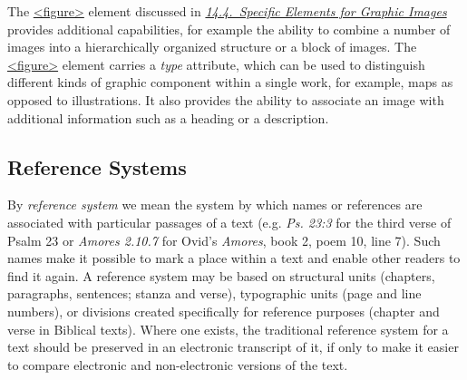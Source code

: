 The \hyperref[TEI.figure]{<figure>} element discussed in \textit{\hyperref[FTGRA]{14.4.\ Specific Elements for Graphic Images}} provides additional capabilities, for example the ability to combine a number of images into a hierarchically organized structure or a block of images. The \hyperref[TEI.figure]{<figure>} element carries a {\itshape type} attribute, which can be used to distinguish different kinds of graphic component within a single work, for example, maps as opposed to illustrations. It also provides the ability to associate an image with additional information such as a heading or a description.
\subsection[{Reference Systems}]{Reference Systems}\label{CORS}\par
By \textit{reference system} we mean the system by which names or references are associated with particular passages of a text (e.g. \textit{Ps. 23:3} for the third verse of Psalm 23 or \textit{Amores 2.10.7} for Ovid's \textit{Amores}, book 2, poem 10, line 7). Such names make it possible to mark a place within a text and enable other readers to find it again. A reference system may be based on structural units (chapters, paragraphs, sentences; stanza and verse), typographic units (page and line numbers), or divisions created specifically for reference purposes (chapter and verse in Biblical texts). Where one exists, the traditional reference system for a text should be preserved in an electronic transcript of it, if only to make it easier to compare electronic and non-electronic versions of the text.\par
